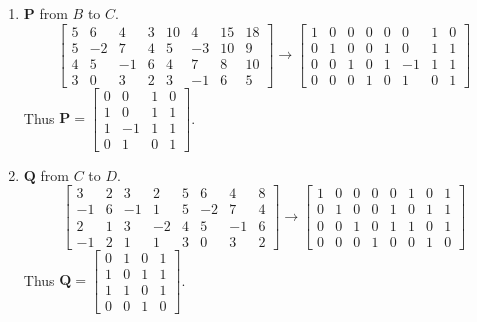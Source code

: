 \documentclass{article}
\theoremstyle{definition}
\begin{document}
    
    \begin{prob}{22} $  $
    	\begin{enumerate}[label=\alph*.)]
    		\item $ \mathbf{P} $ from $ B $ to $ C $.
    			\[
					\left[
						\begin{array}{cccc|cccc}
							5 & 6 & 4 & 3 & 10 & 4 & 15 & 18 \\
							5 & -2 & 7 & 4 & 5 & -3 & 10 & 9 \\
							4 & 5 & -1 & 6 & 4 & 7 & 8 & 10 \\
							3 & 0 & 3 & 2 & 3 & -1 & 6 & 5
						\end{array}
					\right]
					\longrightarrow
					\left[
						\begin{array}{cccc|cccc}
							1 & 0 & 0 & 0 & 0 & 0 & 1 & 0 \\
							0 & 1 & 0 & 0 & 1 & 0 & 1 & 1 \\
							0 & 0 & 1 & 0 & 1 & -1 & 1 & 1 \\
							0 & 0 & 0 & 1 & 0 & 1 & 0 & 1
						\end{array}
					\right]
    			\]
    			Thus $ \mathbf{P} = \begin{bmatrix} 0 & 0 & 1 & 0 \\ 1 & 0 & 1 & 1 \\ 1 & -1 & 1 & 1 \\ 0 & 1 & 0 & 1 \end{bmatrix} $.\\
    			
    		\item $ \mathbf{Q} $ from $ C $ to $ D $.
    			\[
    				\left[
    					\begin{array}{cccc|cccc}
    						3 & 2 & 3 & 2 & 5 & 6 & 4 & 8 \\
    						-1 & 6 & -1 & 1 & 5 & -2 & 7 & 4 \\
    						2 & 1 & 3 & -2 & 4 & 5 & -1 & 6 \\
    						-1 & 2 & 1 & 1 & 3 & 0 & 3 & 2
    					\end{array}
    				\right]
    				\longrightarrow
    				\left[
    					\begin{array}{cccc|cccc}
    						1 & 0 & 0 & 0 & 0 & 1 & 0 & 1 \\
    						0 & 1 & 0 & 0 & 1 & 0 & 1 & 1 \\
    						0 & 0 & 1 & 0 & 1 & 1 & 0 & 1 \\
    						0 & 0 & 0 & 1 & 0 & 0 & 1 & 0
    					\end{array}
    				\right]
    			\]
    			Thus $ \mathbf{Q} = \begin{bmatrix} 0 & 1 & 0 & 1 \\ 1 & 0 & 1 & 1 \\ 1 & 1 & 0 & 1 \\ 0 & 0 & 1 & 0 \end{bmatrix} $.\\
    			

\end{enumerate}
\end{prob}
\end{document}
